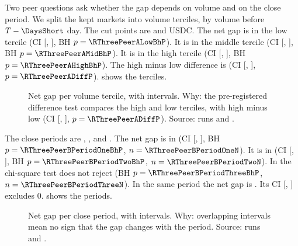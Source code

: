 Two peer questions ask whether the gap depends on volume and on the close period.
We split the kept markets into volume terciles, by volume before $T-\DaysShort$ day.
The cut points are \RThreePeerACutLowMid{} and \RThreePeerACutMidHigh{} USDC.
The net gap is \RThreePeerALowNetGap{} in the low tercile (CI [\RThreePeerALowNetGapCiLow, \RThreePeerALowNetGapCiHigh], BH $p=\RThreePeerALowBhP$).
It is \RThreePeerAMidNetGap{} in the middle tercile (CI [\RThreePeerAMidNetGapCiLow, \RThreePeerAMidNetGapCiHigh], BH $p=\RThreePeerAMidBhP$).
It is \RThreePeerAHighNetGap{} in the high tercile (CI [\RThreePeerAHighNetGapCiLow, \RThreePeerAHighNetGapCiHigh], BH $p=\RThreePeerAHighBhP$).
The high minus low difference is \RThreePeerADiff{} (CI [\RThreePeerADiffCiLow, \RThreePeerADiffCiHigh], $p=\RThreePeerADiffP$).
 shows the terciles.

\begin{figure}[H]
\centering
{}
\caption{Net gap per volume tercile, with \CiLevel{} intervals. Why: the pre-registered difference test compares the high and low terciles, with high minus low \RThreePeerADiff{} (CI [\RThreePeerADiffCiLow, \RThreePeerADiffCiHigh], $p=\RThreePeerADiffP$). Source: runs \RThreeRun{} and \RThreeFigRun.}
\label{fig:r3-peer-a}
\end{figure}

The close periods are \RThreePeerBPeriodOneLabel, \RThreePeerBPeriodTwoLabel, and \RThreePeerBPeriodThreeLabel.
The net gap is \RThreePeerBPeriodOneNetGap{} in \RThreePeerBPeriodOneLabel{} (CI [\RThreePeerBPeriodOneNetGapCiLow, \RThreePeerBPeriodOneNetGapCiHigh], BH $p=\RThreePeerBPeriodOneBhP$, $n=\RThreePeerBPeriodOneN$).
It is \RThreePeerBPeriodTwoNetGap{} in \RThreePeerBPeriodTwoLabel{} (CI [\RThreePeerBPeriodTwoNetGapCiLow, \RThreePeerBPeriodTwoNetGapCiHigh], BH $p=\RThreePeerBPeriodTwoBhP$, $n=\RThreePeerBPeriodTwoN$).
In \RThreePeerBPeriodThreeLabel{} the chi-square test does not reject (BH $p=\RThreePeerBPeriodThreeBhP$, $n=\RThreePeerBPeriodThreeN$).
In the same period the net gap is \RThreePeerBPeriodThreeNetGap.
Its \CiLevel{} CI [\RThreePeerBPeriodThreeNetGapCiLow, \RThreePeerBPeriodThreeNetGapCiHigh] excludes 0.
 shows the periods.

\begin{figure}[H]
\centering
{}
\caption{Net gap per close period, with \CiLevel{} intervals. Why: overlapping intervals mean no sign that the gap changes with the period. Source: runs \RThreeRun{} and \RThreeFigRun.}
\label{fig:r3-peer-b}
\end{figure}
